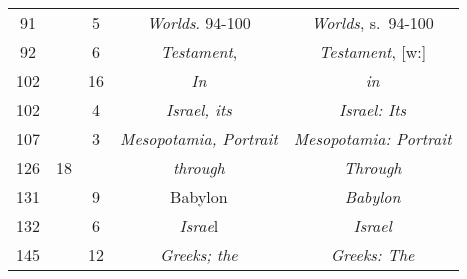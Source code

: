 \documentclass[a4paper,11pt]{article}
\begin{document}
\begin{center}
\begin{tabular}{|c|c|c|c|c|}
    91  & &  5 & \emph{Worlds}. 94-100 & \emph{Worlds}, s.~94-100 \\
    92  & &  6 & \emph{Testament}, & \emph{Testament}, [w:] \\
    102 & & 16 & \emph{In} & \emph{in} \\
    102 & &  4 & \emph{Israel, its} & \emph{Israel: Its} \\
    107 & &  3 & \emph{Mesopotamia, Portrait}
           & \emph{Mesopotamia: Portrait} \\
    126 & 18 & & \emph{through} & \emph{Through} \\
    131 & &  9 & Babylon & \emph{Babylon} \\
    132 & &  6 & \emph{Israe}l & \emph{Israel} \\
    145 & & 12 & \emph{Greeks; the} & \emph{Greeks: The} \\
    \hline
  \end{tabular}



\end{center}
\end{document}
